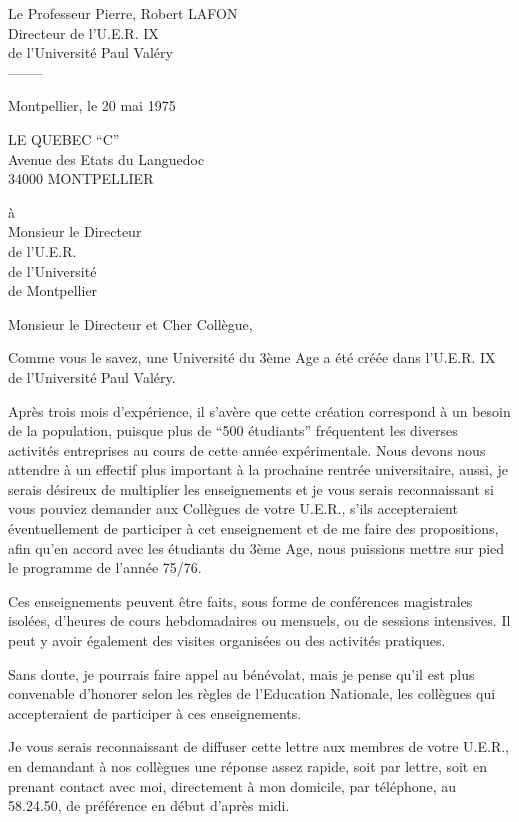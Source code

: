 Le Professeur Pierre, Robert LAFON\\
Directeur de l'U.E.R. IX\\
de l'Université Paul Valéry\\
--------

Montpellier, le 20 mai 1975

LE QUEBEC ``C''\\
Avenue des Etats du Languedoc\\
34000 MONTPELLIER

à\\
Monsieur le Directeur\\
de l'U.E.R.\\
de l'Université\\
de Montpellier

Monsieur le Directeur et Cher Collègue,

Comme vous le savez, une Université du 3ème Age a été créée dans l'U.E.R. IX de l'Université Paul Valéry.

Après trois mois d'expérience, il s'avère que cette création correspond à un besoin de la population, puisque plus de ``500 étudiants'' fréquentent les diverses activités entreprises au cours de cette année expérimentale. Nous devons nous attendre à un effectif plus important à la prochaine rentrée universitaire, aussi, je serais désireux de multiplier les enseignements et je vous serais reconnaissant si vous pouviez demander aux Collègues de votre U.E.R., s'ils accepteraient éventuellement de participer à cet enseignement et de me faire des propositions, afin qu'en accord avec les étudiants du 3ème Age, nous puissions mettre sur pied le programme de l'année 75/76.

Ces enseignements peuvent être faits, sous forme de conférences magistrales isolées, d'heures de cours hebdomadaires ou mensuels, ou de sessions intensives. Il peut y avoir également des visites organisées ou des activités pratiques.

Sans doute, je pourrais faire appel au bénévolat, mais je pense qu'il est plus convenable d'honorer selon les règles de l'Education Nationale, les collègues qui accepteraient de participer à ces enseignements.

Je vous serais reconnaissant de diffuser cette lettre aux membres de votre U.E.R., en demandant à nos collègues une réponse assez rapide, soit par lettre, soit en prenant contact avec moi, directement à mon domicile, par téléphone, au 58.24.50, de préférence en début d'après midi.

